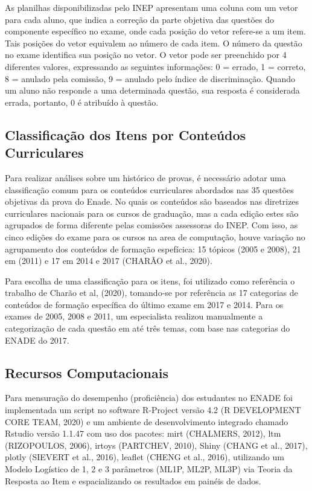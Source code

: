 \documentclass[12pt]{article}
\begin{document}
As planilhas disponibilizadas pelo INEP apresentam uma coluna com um vetor para cada aluno, que
indica a correção da parte objetiva das questões do componente específico no exame, onde cada posição do vetor refere-se a um item. Tais posições do vetor equivalem ao número de cada item. O número da questão no exame identifica sua posição no vetor. O vetor pode ser preenchido por 4 diferentes valores, expressando as seguintes informações: 0 = errado, 1 = correto, 8 = anulado pela comissão, 9 = anulado pelo índice de discriminação. Quando um aluno não responde a uma determinada questão, sua resposta é considerada errada, portanto, 0 é atribuído à
questão.

\subsection{Classificação dos Itens por Conteúdos Curriculares}

Para realizar análises sobre um histórico de provas, é necessário adotar uma classificação comum para os conteúdos curriculares abordados nas 35 questões objetivas da prova do Enade. No quais os conteúdos são baseados nas diretrizes curriculares nacionais para os cursos de graduação, mas a cada edição estes são agrupados de forma diferente pelas comissões assessoras do INEP. Com isso, as cinco edições do exame para os cursos na area de computação, houve variação no agrupamento dos conteúdos de formação espefícica: 15 tópicos (2005 e 2008), 21 em (2011) e 17 em 2014 e 2017 (CHARÃO et al., 2020).

Para escolha de uma classificação para os itens, foi utilizado como referência o trabalho de Charão et al, (2020), tomando-se por referência as 17 categorias de conteúdos de formação específica do último exame em 2017 e 2014. Para os exames de 2005, 2008 e 2011, um especialista realizou manualmente a categorização de cada questão em até três temas, com base nas categorias do ENADE do 2017. 



\subsection{Recursos Computacionais}
\label{sec:metbet}

Para mensuração do desempenho (proficiência) dos estudantes no ENADE foi implementada um script no software R-Project versão 4.2 (R DEVELOPMENT CORE TEAM, 2020) e um ambiente de desenvolvimento integrado chamado Rstudio versão 1.1.47 com uso dos pacotes: mirt (CHALMERS, 2012), ltm (RIZOPOULOS, 2006), irtoys (PARTCHEV, 2010), Shiny (CHANG et al., 2017), plotly (SIEVERT et al., 2016), leaflet (CHENG et al., 2016), utilizando um Modelo Logístico de 1, 2 e 3 parâmetros (ML1P, ML2P, ML3P) via Teoria da Resposta ao Item e espacializando os resultados em painéis de dados.
\end{document}
